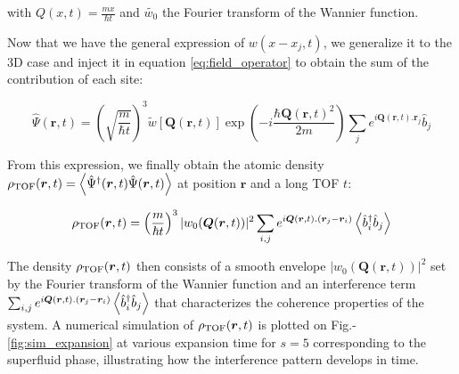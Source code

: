 \noindent with $Q(x,t)=\frac{m x}{\hbar t}$ and $\tilde{w_0}$ the Fourier transform of the Wannier function. 

Now that we have the general expression of $w\left(x-x_{j}, t\right)$, we generalize it to the 3D case and inject it in equation \ref{eq:field_operator} to obtain the sum of the contribution of each site:

\begin{equation}
    \hat{\Psi} (\bm{r},t) = \left(\sqrt{\frac{m}{\hbar t}} \right)^3 \tilde{w}[\bm{Q}(\bm{r},t)] \exp\left(-i \frac{\hbar \bm{Q}(\bm{r},t)^{2}}{2 m} \right) \sum_j e^{i \bm{Q}(\bm{r},t). \bm{r}_{j}} \hat{b}_j
\end{equation}

\noindent From this expression, we finally obtain the atomic density $\rho_{\rm{TOF}}(\bm{r},t) = \left\langle\hat{\Psi}^{\dagger} (\bm{r},t) \hat{\Psi} (\bm{r},t)\right\rangle$ at position $\bm{r}$ and a long TOF $t$:

\begin{equation}
    \rho_{\rm{TOF}}(\bm{r},t) = \left(\frac{m}{\hbar t} \right)^3 |w_0(\bm{Q}(\bm{r},t))|^2 \sum_{i,j} e^{i \bm{Q}(\bm{r},t).(\bm{r}_j - \bm{r}_{i})} \left\langle\hat{b}^{\dagger}_i \hat{b}_j \right\rangle
    \label{eq:rho_tof}
\end{equation}

\noindent The density $\rho_{\rm{TOF}}(\bm{r},t)$ then consists of a smooth envelope $|w_0(\bm{Q}(\bm{r},t))|^2$ set by the Fourier transform of the Wannier function and an interference term $\sum_{i,j} e^{i \bm{Q}(\bm{r},t).(\bm{r}_j - \bm{r}_{i})} \left\langle\hat{b}^{\dagger}_i \hat{b}_j \right\rangle$ that characterizes the coherence properties of the system. A numerical simulation of $\rho_{\rm{TOF}}(\bm{r},t)$ is plotted on Fig.-\ref{fig:sim_expansion} at various expansion time for $s=5$ corresponding to the superfluid phase, illustrating how the interference pattern develops in time.

